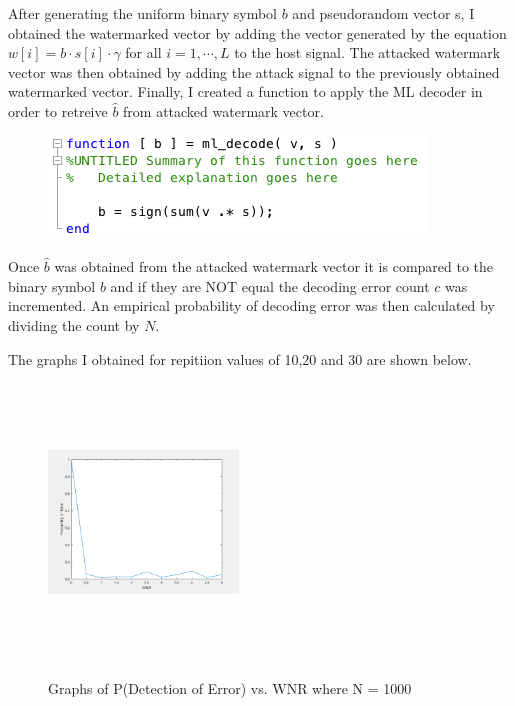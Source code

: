 \documentclass[]{assignment}
\begin{document}
After generating the uniform binary symbol $b$ and pseudorandom vector s, I obtained the watermarked vector by adding the vector generated by the equation $w[i]=b\cdot s[i]\cdot  \gamma$ for all $i=1,\cdots,L$ to the host signal. The attacked watermark vector was then obtained by adding the attack signal to the previously obtained watermarked vector. Finally, I created a function to apply the ML decoder in order to retreive $\hat{b}$ from attacked watermark vector.

\begin{figure}[h] 
\centering
\includegraphics[scale=0.75]{code_snippet2}
\end{figure}

Once $\hat{b}$ was obtained from the attacked watermark vector it is compared to the binary symbol $b$ and if they are NOT equal the decoding error count $c$ was incremented. An empirical probability of decoding error was then calculated by dividing the count by $N$. 

The graphs I obtained for repitiion values of 10,20 and 30 are shown below.

\begin{figure}[h]
\centering
\fboxsep 0mm
\parbox{5cm}{\\}
~~~
\parbox{5cm}{\includegraphics[width=5.05cm]{L_20}\\}
~~~
\parbox{5cm}{\\}
\caption{\label{fig:imgfilter1} Graphs of P(Detection of Error) vs. WNR where N = 1000}
\end{figure} 
\end{document}
